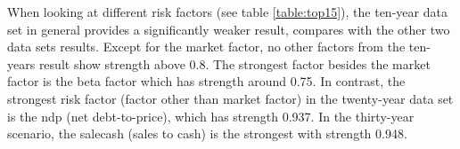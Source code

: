 
When looking at different risk factors (see table \ref{table:top15}),  the ten-year data set in general provides a significantly weaker result, compares with the other two data sets results.
Except for the market factor, no other factors from the ten-years result show strength above 0.8.
The strongest factor besides the market factor is the beta factor which has strength around 0.75.
In contrast, the strongest risk factor (factor other than market factor) in the twenty-year data set is the ndp (net debt-to-price), which has strength 0.937.
In the thirty-year scenario, the salecash (sales to cash) is the strongest with strength 0.948.

